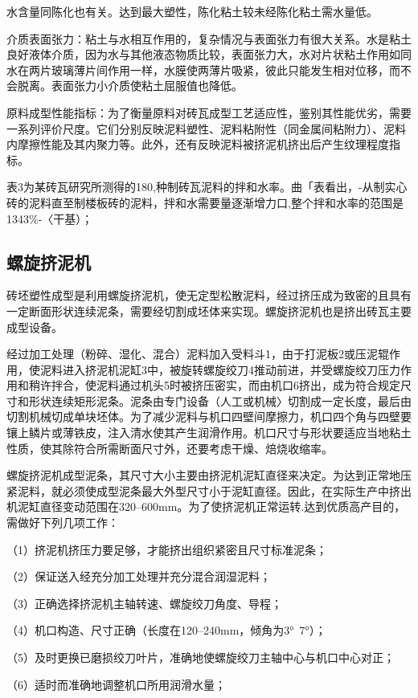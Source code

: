 \documentclass{ctexbook}
\begin{document}
水含量同陈化也有关。达到最大塑性，陈化粘土较未经陈化粘土需水量低。

介质表面张力：粘土与水相互作用的，复杂情况与表面张力有很大关系。水是粘土良好液体介质，因为水与其他液态物质比较，表面张力大，水对片状粘土作用如同水在两片玻璃薄片间作用一样，水膜使两薄片吸紧，彼此只能发生相对位移，而不会脱离。表面张力小介质使粘土屈服值也降低。

原料成型性能指标：为了衡量原料对砖瓦成型工艺适应性，鉴别其性能优劣，需要一系列评价尺度。它们分别反映泥料塑性、泥料粘附性（同金属间粘附力）、泥料内摩擦性能及其内聚力等。此外，还有反映泥料被挤泥机挤出后产生纹理程度指标。

表3为某砖瓦研究所测得的180,种制砖瓦泥料的拌和水率。曲「表看出，-从制实心砖的泥料直至制楼板砖的泥料，拌和水需要量逐渐增力口,整个拌和水率的范围是1343\%-〈干基）；

\subsection{螺旋挤泥机}
砖坯塑性成型是利用螺旋挤泥机，使无定型松散泥料，经过挤压成为致密的且具有一定断面形状连续泥条，需要经切割成坯体来实现。螺旋挤泥机也是挤出砖瓦主要成型设备。

经过加工处理（粉碎、湿化、混合）泥料加入受料斗1，由于打泥板2或压泥辊作用，使泥料进入挤泥机泥缸3中，被旋转螺旋绞刀4推动前进，并受螺旋绞刀压力作用和稍许拌合，使泥料通过机头5时被挤压密实，而由机口6挤出，成为符合规定尺寸和形状连续矩形泥条。泥条由专门设备（人工或机械〉切割成一定长度，最后由切割机械切成单块坯体。为了减少泥料与机口四壁间摩擦力，机口四个角与四壁要镶上鳞片或薄铁皮，注入清水使其产生润滑作用。机口尺寸与形状要适应当地粘土性质，使其除符合所需断面尺寸外，还要考虑干燥、焙烧收缩率。

螺旋挤泥机成型泥条，其尺寸大小主要由挤泥机泥缸直径来决定。为达到正常地压紧泥料，就必须使成型泥条最大外型尺寸小于泥缸直径。因此，在实际生产中挤出机泥缸直径变动范围在320--600mm。为了使挤泥机正常运转.达到优质高产目的，需做好下列几项工作：

（1）挤泥机挤压力要足够，才能挤出组织紧密且尺寸标准泥条；

（2）保证送入经充分加工处理并充分混合润湿泥料；

（3）正确选择挤泥机主轴转速、螺旋绞刀角度、导程；

（4）机口构造、尺寸正确（长度在120--240mm，倾角为3°~7°）；

（5）及时更换已磨损绞刀叶片，准确地使螺旋绞刀主轴中心与机口中心对正；

（6）适时而准确地调整机口所用润滑水量；
\end{document}
